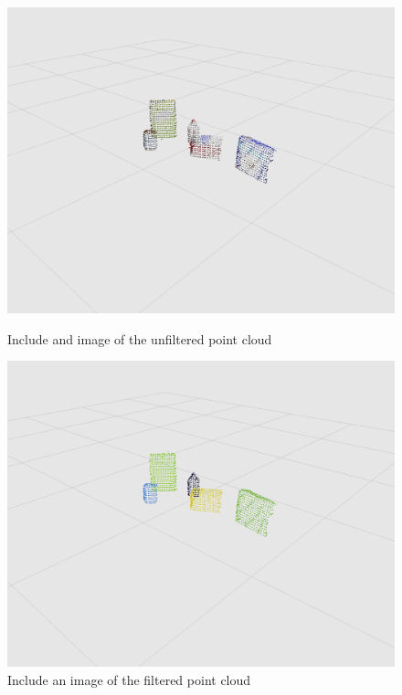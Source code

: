 \documentclass[a4paper]{article}
\begin{document}
\vspace{1cm}

\begin{figure}[h]
\centering
\begin{minipage}{0.45\linewidth}
\centering
\includegraphics[scale=0.2]{image8}
\caption{Include and image of the unfiltered point cloud}
\end{minipage}
\hspace{0.5cm}
\begin{minipage}{0.45\linewidth}
\centering
\includegraphics[scale=0.2]{image9}
\caption{Include an image of the filtered point cloud}
\end{minipage}
\end{figure}
\end{document}
